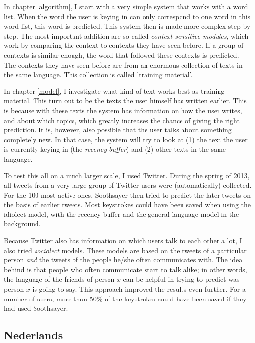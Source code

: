 \documentclass[12pt]{article}
\begin{document}
In chapter \ref{algorithm}, I start with a very simple system that works with a word list. When the word the user is keying in can only correspond to one word in this word list, this word is predicted. This system then is made more complex step by step. The most important addition are so-called \emph{context-sensitive modules}, which work by comparing the context to contexts they have seen before. If a group of contexts is similar enough, the word that followed these contexts is predicted. The contexts they have seen before are from an enormous collection of texts in the same language. This collection is called 'training material'.

In chapter \ref{model}, I investigate what kind of text works best as training material. This turn out to be the texts the user himself has written earlier. This is because with these texts the system has information on how the user writes, and about which topics, which greatly increases the chance of giving the right prediction. It is, however, also possible that the user talks about something completely new. In that case, the system will try to look at (1) the text the user is currently keying in (the \emph{recency buffer}) and (2) other texts in the same language.

To test this all on a much larger scale, I used Twitter. During the spring of 2013, all tweets from a very large group of Twitter users were (automatically) collected. For the 100 most active ones, Soothsayer then tried to predict the later tweets on the basis of earlier tweets. Most keystrokes could have been saved when using the idiolect model, with the recency buffer and the general language model in the background. 

Because Twitter also has information on which users talk to each other a lot, I also tried \emph{sociolect} models. These models are based on the tweets of a particular person \emph{and} the tweets of the people he/she often communicates with. The idea behind is that people who often communicate start to talk alike; in other words, the language of the friends of person $x$ can be helpful in trying to predict was person $x$ is going to say. This approach improved the results even further. For a number of users, more than 50\% of the keystrokes could have been saved if they had used Soothsayer. 

\subsection{Nederlands}
\end{document}
